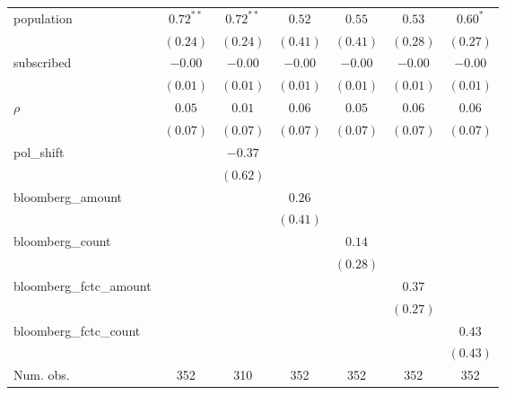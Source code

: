 \begin{table}[!h]
\begin{center}
\begin{tabular}{l c c c c c c }
population              & $0.72^{**}$  & $0.72^{**}$  & $0.52$       & $0.55$       & $0.53$       & $0.60^{*}$   \\
                        & $(0.24)$     & $(0.24)$     & $(0.41)$     & $(0.41)$     & $(0.28)$     & $(0.27)$     \\
subscribed              & $-0.00$      & $-0.00$      & $-0.00$      & $-0.00$      & $-0.00$      & $-0.00$      \\
                        & $(0.01)$     & $(0.01)$     & $(0.01)$     & $(0.01)$     & $(0.01)$     & $(0.01)$     \\
$\rho$                  & $0.05$       & $0.01$       & $0.06$       & $0.05$       & $0.06$       & $0.06$       \\
                        & $(0.07)$     & $(0.07)$     & $(0.07)$     & $(0.07)$     & $(0.07)$     & $(0.07)$     \\
pol\_shift              &              & $-0.37$      &              &              &              &              \\
                        &              & $(0.62)$     &              &              &              &              \\
bloomberg\_amount       &              &              & $0.26$       &              &              &              \\
                        &              &              & $(0.41)$     &              &              &              \\
bloomberg\_count        &              &              &              & $0.14$       &              &              \\
                        &              &              &              & $(0.28)$     &              &              \\
bloomberg\_fctc\_amount &              &              &              &              & $0.37$       &              \\
                        &              &              &              &              & $(0.27)$     &              \\
bloomberg\_fctc\_count  &              &              &              &              &              & $0.43$       \\
                        &              &              &              &              &              & $(0.43)$     \\
\midrule
Num. obs.               & 352          & 310          & 352          & 352          & 352          & 352          \\

\end{tabular}
\end{center}
\end{table}
